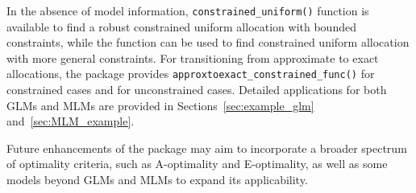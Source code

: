 In the absence of model information, \texttt{constrained\_uniform()} function is available to find a robust constrained uniform allocation with bounded constraints, while the \texttt{} function can be used to find constrained uniform allocation with more general constraints. For transitioning from approximate to exact allocations, the package provides \texttt{approxtoexact\_constrained\_func()} for constrained cases and \texttt{} for unconstrained cases. Detailed applications for both GLMs and MLMs are provided in Sections~\ref{sec:example_glm} and~\ref{sec:MLM_example}.

Future enhancements of the package may aim to incorporate a broader spectrum of optimality criteria, such as A-optimality and E-optimality, as well as some models beyond GLMs and MLMs to expand its applicability.



\address{Yifei Huang\\
  Department of Mathematics, Statistics, and Computer Science\\
  University of Illinois at Chicago\\
  E-mail: }

\address{Liping Tong\\
  Advocate Aurora Health\\
  E-mail: }

\address{Jie Yang\\
  Department of Mathematics, Statistics, and Computer Science\\
  University of Illinois at Chicago\\
  E-mail: }
